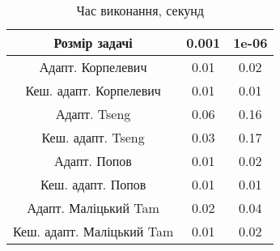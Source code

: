 \begin{table}[H]
	\centering
	\begin{tabular}{|c||c|c|}\hline
		Розмір задачі & 0.001 & 1e-06 \\ \hline \hline
		Адапт. Корпелевич & 0.01 & 0.02 \\ \hline
		Кеш. адапт. Корпелевич & 0.01 & 0.01 \\ \hline
		Адапт. Tseng & 0.06 & 0.16 \\ \hline
		Кеш. адапт. Tseng & 0.03 & 0.17 \\ \hline
		Адапт. Попов & 0.01 & 0.02 \\ \hline
		Кеш. адапт. Попов & 0.01 & 0.01 \\ \hline
		Адапт. Маліцький Tam & 0.02 & 0.04 \\ \hline
		Кеш. адапт. Маліцький Tam & 0.01 & 0.02 \\ \hline
	\end{tabular}
	\caption{Час виконання, секунд}
\end{table}
